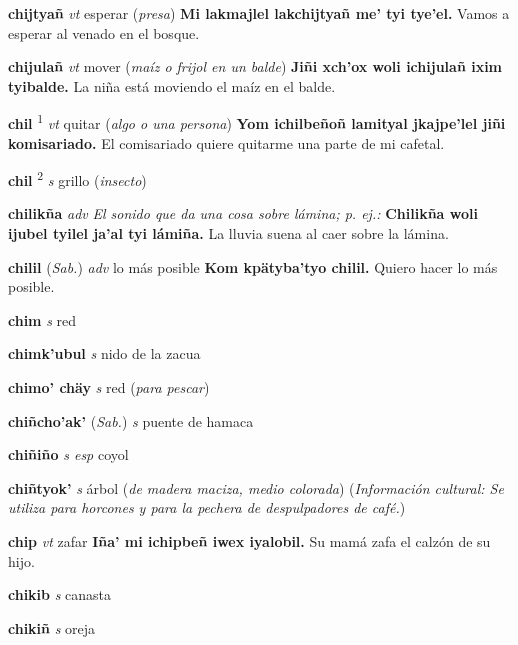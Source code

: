 \documentclass[10pt]{scrbook}
\newcommand{\entry}[1]{\textbf{#1}}
\newcommand{\defsuperscript}[1]{\textsuperscript{#1}}
\newcommand{\nontranslationdef}[1]{\textit{#1}}
\newcommand{\partofspeech}[1]{\textit{#1}}
\newcommand{\spanishtranslation}[1]{#1}
\newcommand{\clarification}[1]{(\textit{#1})}
\newcommand{\cholexample}[1]{\textbf{#1}}
\newcommand{\exampletranslation}[1]{#1}
\newcommand{\relevantdialect}[1]{(\textit{#1})}
\newcommand{\culturalinformation}[1]{(\textit{#1})}
\begin{document}
\begin{multicols}{2}
\entry{chijtyañ}
\partofspeech{vt}
\spanishtranslation{esperar}
\clarification{presa}
\cholexample{Mi lakmajlel lakchijtyañ me' tyi tye'el.}
\exampletranslation{Vamos a esperar al venado en el bosque.}

\entry{chijulañ}
\partofspeech{vt}
\spanishtranslation{mover}
\clarification{maíz o frijol en un balde}
\cholexample{Jiñi xch'ox woli ichijulañ ixim tyibalde.}
\exampletranslation{La niña está moviendo el maíz en el balde.}

\entry{chil}
\defsuperscript{1}
\partofspeech{vt}
\spanishtranslation{quitar}
\clarification{algo o una persona}
\cholexample{Yom ichilbeñoñ lamityal jkajpe'lel jiñi komisariado.}
\exampletranslation{El comisariado quiere quitarme una parte de mi cafetal.}

\entry{chil}
\defsuperscript{2}
\partofspeech{s}
\spanishtranslation{grillo}
\clarification{insecto}

\entry{chilikña}
\partofspeech{adv}
\nontranslationdef{El sonido que da una cosa sobre lámina; p. ej.:}
\cholexample{Chilikña woli ijubel tyilel ja'al tyi lámiña.}
\exampletranslation{La lluvia suena al caer sobre la lámina.}

\entry{chilil}
\relevantdialect{Sab.}
\partofspeech{adv}
\spanishtranslation{lo más posible}
\cholexample{Kom kpätyba'tyo chilil.}
\exampletranslation{Quiero hacer lo más posible.}

\entry{chim}
\partofspeech{s}
\spanishtranslation{red}

\entry{chimk'ubul}
\partofspeech{s}
\spanishtranslation{nido de la zacua}

\entry{chimo' chäy}
\partofspeech{s}
\spanishtranslation{red}
\clarification{para pescar}

\entry{chiñcho'ak'}
\relevantdialect{Sab.}
\partofspeech{s}
\spanishtranslation{puente de hamaca}

\entry{chiñiño}
\partofspeech{s esp}
\spanishtranslation{coyol}

\entry{chiñtyok'}
\partofspeech{s}
\spanishtranslation{árbol}
\clarification{de madera maciza, medio colorada}
\culturalinformation{Información cultural: Se utiliza para horcones y para la pechera de despulpadores de café.}

\entry{chip}
\partofspeech{vt}
\spanishtranslation{zafar}
\cholexample{Iña' mi ichipbeñ iwex iyalobil.}
\exampletranslation{Su mamá zafa el calzón de su hijo.}

\entry{chikib}
\partofspeech{s}
\spanishtranslation{canasta}

\entry{chikiñ}
\partofspeech{s}
\spanishtranslation{oreja}


\end{multicols}
\end{document}
